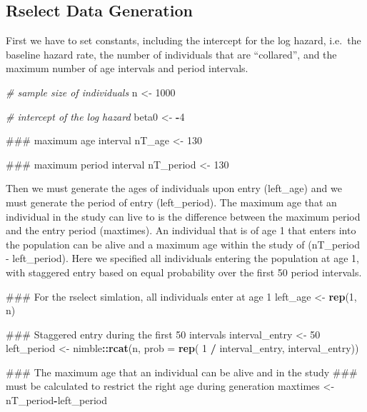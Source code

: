 \documentclass[11pt,]{article}
\newenvironment{Shaded}{\begin{snugshade}}{\end{snugshade}}
\newcommand{\KeywordTok}[1]{\textcolor[rgb]{0.13,0.29,0.53}{\textbf{#1}}}
\newcommand{\DataTypeTok}[1]{\textcolor[rgb]{0.13,0.29,0.53}{#1}}
\newcommand{\DecValTok}[1]{\textcolor[rgb]{0.00,0.00,0.81}{#1}}
\newcommand{\StringTok}[1]{\textcolor[rgb]{0.31,0.60,0.02}{#1}}
\newcommand{\CommentTok}[1]{\textcolor[rgb]{0.56,0.35,0.01}{\textit{#1}}}
\newcommand{\OperatorTok}[1]{\textcolor[rgb]{0.81,0.36,0.00}{\textbf{#1}}}
\newcommand{\NormalTok}[1]{#1}
\begin{document}
\subsection{Rselect Data Generation}\label{rselect-data-generation}

First we have to set constants, including the intercept for the log
hazard, i.e.~the baseline hazard rate, the number of individuals that
are ``collared'', and the maximum number of age intervals and period
intervals.

\begin{Shaded}
\begin{Highlighting}[]
  \CommentTok{# sample size of individuals}
\NormalTok{  n <-}\StringTok{ }\DecValTok{1000}

  \CommentTok{# intercept of the log hazard}
\NormalTok{  beta0 <-}\StringTok{ }\OperatorTok{-}\DecValTok{4}

\NormalTok{  ### maximum age interval}
\NormalTok{  nT_age <-}\StringTok{ }\DecValTok{130}

\NormalTok{  ### maximum period interval}
\NormalTok{  nT_period <-}\StringTok{ }\DecValTok{130}
\end{Highlighting}
\end{Shaded}

Then we must generate the ages of individuals upon entry (left\_age) and
we must generate the period of entry (left\_period). The maximum age
that an individual in the study can live to is the difference between
the maximum period and the entry period (maxtimes). An individual that
is of age 1 that enters into the population can be alive and a maximum
age within the study of (nT\_period - left\_period). Here we specified
all individuals entering the population at age 1, with staggered entry
based on equal probability over the first 50 period intervals.

\begin{Shaded}
\begin{Highlighting}[]
\NormalTok{  ### For the rselect simlation, all individuals enter at age 1}
\NormalTok{  left_age <-}\StringTok{ }\KeywordTok{rep}\NormalTok{(}\DecValTok{1}\NormalTok{, n)}

\NormalTok{  ### Staggered entry during the first 50 intervals}
\NormalTok{  interval_entry <-}\StringTok{ }\DecValTok{50}
\NormalTok{  left_period <-}\StringTok{ }\NormalTok{nimble}\OperatorTok{::}\KeywordTok{rcat}\NormalTok{(n, }\DataTypeTok{prob =} \KeywordTok{rep}\NormalTok{( }\DecValTok{1} \OperatorTok{/}\StringTok{ }\NormalTok{interval_entry, interval_entry))}

\NormalTok{  ### The maximum age that an individual can be alive and in the study}
\NormalTok{  ### must be calculated to restrict the right age during generation}
\NormalTok{  maxtimes <-}\StringTok{ }\NormalTok{nT_period}\OperatorTok{-}\NormalTok{left_period}
\end{Highlighting}
\end{Shaded}
\end{document}
